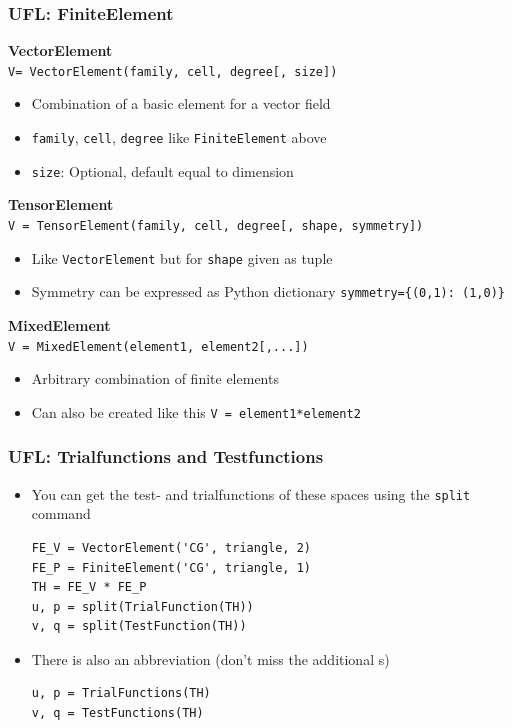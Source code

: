 \documentclass[aspectratio=169,11pt]{beamer}
\theoremstyle{definition}
\begin{document}
\begin{frame}[fragile]
  \frametitle{UFL: FiniteElement}
  \textbf{VectorElement}\\
  \lstinline[basicstyle=\small]{V= VectorElement(family, cell, degree[, size])}
  \begin{itemize}
  \item Combination of a basic element for a vector field
  \item \lstinline{family}, \lstinline{cell}, \lstinline{degree} like \lstinline{FiniteElement} above
  \item \lstinline{size}: Optional, default equal to dimension
  \end{itemize}

  \textbf{TensorElement}\\
  \lstinline[basicstyle=\small]{V = TensorElement(family, cell, degree[, shape, symmetry])}
  \begin{itemize}
  \item Like \lstinline{VectorElement} but for \lstinline{shape} given as tuple
  \item Symmetry can be expressed as Python dictionary
    \lstinline|symmetry={(0,1): (1,0)}|
  \end{itemize}

  \textbf{MixedElement}\\
  \lstinline[basicstyle=\small]{V = MixedElement(element1, element2[,...])}
  \begin{itemize}
  \item Arbitrary combination of finite elements
  \item Can also be created like this \lstinline{V = element1*element2}
  \end{itemize}
\end{frame}


\begin{frame}[fragile]
  \frametitle{UFL: Trialfunctions and Testfunctions}
  \begin{itemize}
  \item You can get the test- and trialfunctions of these spaces using the
    \lstinline{split} command
  \begin{lstlisting}[language={}, basicstyle=\small, backgroundcolor=\color{listingbg}]
FE_V = VectorElement('CG', triangle, 2)
FE_P = FiniteElement('CG', triangle, 1)
TH = FE_V * FE_P
u, p = split(TrialFunction(TH))
v, q = split(TestFunction(TH))
  \end{lstlisting}
  \item There is also an abbreviation (don't miss the additional s)
    \begin{lstlisting}[basicstyle=\small, backgroundcolor=\color{listingbg}]
u, p = TrialFunctions(TH)
v, q = TestFunctions(TH)
    \end{lstlisting}
  \end{itemize}
\end{frame}
\end{document}
